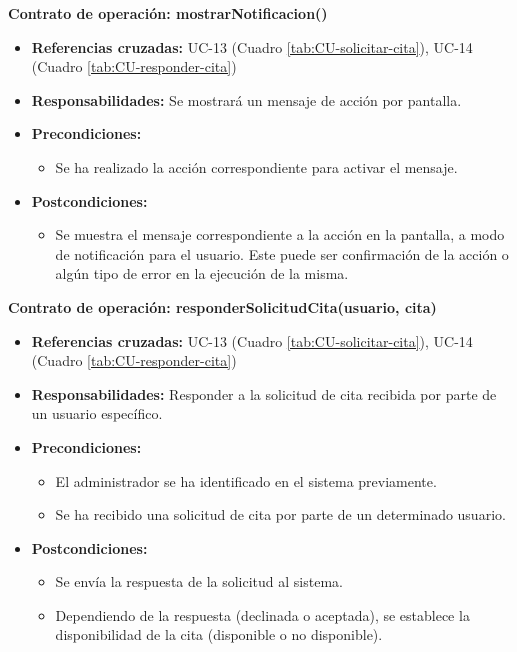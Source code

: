 \textbf{Contrato de operación: mostrarNotificacion()}
\begin{itemize}
\item \textbf{Referencias cruzadas:} UC-13 (Cuadro \ref{tab:CU-solicitar-cita}), UC-14 (Cuadro \ref{tab:CU-responder-cita})
\item \textbf{Responsabilidades:} Se mostrará un mensaje de acción por pantalla.
\item \textbf{Precondiciones:} 
 \begin{itemize}
\item Se ha realizado la acción correspondiente para activar el mensaje.
\end {itemize}
\item \textbf{Postcondiciones:} 
 \begin{itemize}
\item Se muestra el mensaje correspondiente a la acción en la pantalla, a modo de notificación para el usuario. Este puede ser confirmación de la acción o algún tipo de error en la ejecución de la misma.
\end {itemize}
\end {itemize}

\textbf{Contrato de operación: responderSolicitudCita(usuario, cita)}
\begin{itemize}
\item \textbf{Referencias cruzadas:} UC-13 (Cuadro \ref{tab:CU-solicitar-cita}), UC-14 (Cuadro \ref{tab:CU-responder-cita})
\item \textbf{Responsabilidades:} Responder a la solicitud de cita recibida por parte de un usuario específico.
\item \textbf{Precondiciones:} 
 \begin{itemize}
\item El administrador se ha identificado en el sistema previamente.
\item Se ha recibido una solicitud de cita por parte de un determinado usuario.
\end {itemize}
\item \textbf{Postcondiciones:} 
 \begin{itemize}
\item Se envía la respuesta de la solicitud al sistema.
\item Dependiendo de la respuesta (declinada o aceptada), se establece la disponibilidad de la cita (disponible o no disponible).
\end {itemize}
\end {itemize}

